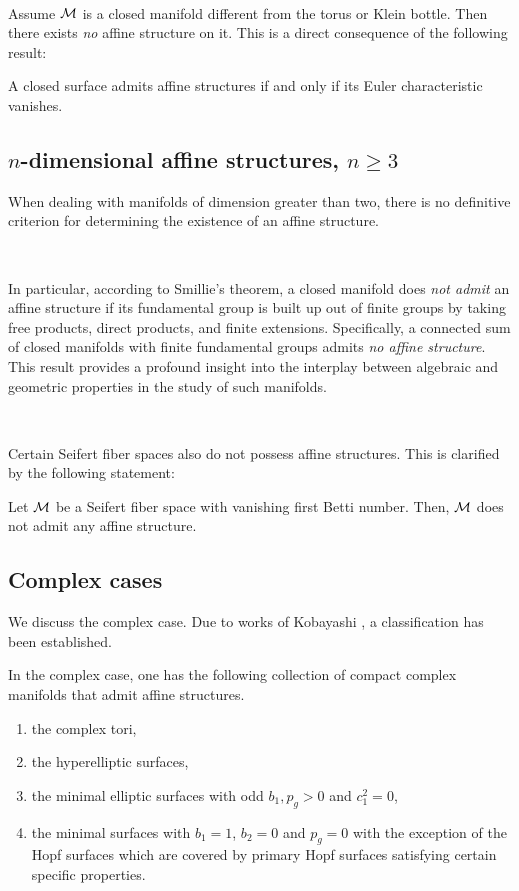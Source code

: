 \,

Assume $\mathcal{M}$ is a closed manifold different from the torus or Klein bottle. Then there exists {\it no} affine structure on it. This is a direct consequence of the following result:

\begin{theorem}[Benzecri, 1955]
A closed surface admits affine structures if and only if its Euler characteristic vanishes.
\end{theorem}

\subsection{$n$-dimensional affine structures, $n \geq 3$}

When dealing with manifolds of dimension greater than two, there is no definitive criterion for determining the existence of an affine structure.

\,

In particular, according to Smillie's theorem, a closed manifold does \textit{not admit} an affine structure if its fundamental group is built up out of finite groups by taking free products, direct products, and finite extensions. Specifically, a connected sum of closed manifolds with finite fundamental groups admits \textit{no affine structure}. This result provides a profound insight into the interplay between algebraic and geometric properties in the study of such manifolds.

\,

Certain Seifert fiber spaces also do not possess affine structures. This is clarified by the following statement:

\begin{proposition}
Let $\mathcal{M}$ be a Seifert fiber space with vanishing first Betti number. Then, $\mathcal{M}$ does not admit any affine structure.
\end{proposition}

\subsection{Complex cases}
We discuss the complex case. Due to works of Kobayashi \cite{Ko1}, a classification has been established. 
\begin{theorem}
In the complex case, one has the following collection of compact complex manifolds that admit affine structures.  
\begin{enumerate}
    \item the complex tori,
    \item the hyperelliptic surfaces,
    \item the minimal elliptic surfaces with odd $b_1,p_g>0$ and $c_1^2=0$,
    \item the minimal surfaces with $b_1=1$, $b_2=0$ and $p_g=0$ with the exception of the Hopf surfaces which are covered by primary Hopf surfaces satisfying certain specific properties. 
\end{enumerate}
\end{theorem}

